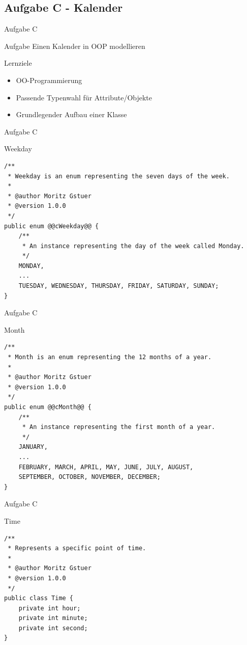 \documentclass[aspectratio=169]{beamer}
\begin{document}
\subsection{Aufgabe C - Kalender}

\begin{frame}{Aufgabe C}
  \begin{block}{Aufgabe}
    \pause
    Einen Kalender in OOP modellieren
  \end{block}

  \pause
  \begin{block}{Lernziele}
    \begin{itemize}
      \item OO-Programmierung
      \pause
      \item Passende Typenwahl für Attribute/Objekte
      \pause
      \item Grundlegender Aufbau einer Klasse
    \end{itemize}
  \end{block}
\end{frame}

\begin{frame}[fragile]{Aufgabe C}
  \begin{block}{Weekday}
    \begin{lstlisting}
/**
 * Weekday is an enum representing the seven days of the week.
 *
 * @author Moritz Gstuer
 * @version 1.0.0
 */
public enum @@cWeekday@@ {
    /**
     * An instance representing the day of the week called Monday.
     */
    MONDAY,
    ...
    TUESDAY, WEDNESDAY, THURSDAY, FRIDAY, SATURDAY, SUNDAY;
}
    \end{lstlisting}
  \end{block}
\end{frame}

\begin{frame}[fragile]{Aufgabe C}
  \begin{block}{Month}
    \begin{lstlisting}
/**
 * Month is an enum representing the 12 months of a year.
 *
 * @author Moritz Gstuer
 * @version 1.0.0
 */
public enum @@cMonth@@ {
    /**
     * An instance representing the first month of a year.
     */
    JANUARY,
    ...
    FEBRUARY, MARCH, APRIL, MAY, JUNE, JULY, AUGUST,
    SEPTEMBER, OCTOBER, NOVEMBER, DECEMBER;
}
    \end{lstlisting}
  \end{block}
\end{frame}

\begin{frame}[fragile]{Aufgabe C}
  \begin{block}{Time}
    \begin{lstlisting}
/**
 * Represents a specific point of time.
 *
 * @author Moritz Gstuer
 * @version 1.0.0
 */
public class Time {
    private int hour;
    private int minute;
    private int second;
}
    \end{lstlisting}
  \end{block}
\end{frame}
\end{document}
